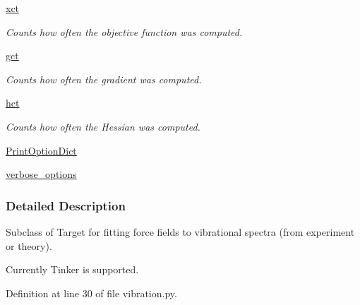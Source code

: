 \begin{DoxyCompactItemize}
\hyperlink{classforcebalance_1_1target_1_1Target_aad2e385cfbf7b4a68f1c2cb41133fe82}{xct}
\begin{DoxyCompactList}\small\item\em Counts how often the objective function was computed. \end{DoxyCompactList}\item 
\hyperlink{classforcebalance_1_1target_1_1Target_aa625ac88c6744eb14ef281d9496d0dbb}{gct}
\begin{DoxyCompactList}\small\item\em Counts how often the gradient was computed. \end{DoxyCompactList}\item 
\hyperlink{classforcebalance_1_1target_1_1Target_a5b5a42f78052b47f29ed4b940c6111a1}{hct}
\begin{DoxyCompactList}\small\item\em Counts how often the Hessian was computed. \end{DoxyCompactList}\item 
\hyperlink{classforcebalance_1_1BaseClass_afc6659278497d7245bc492ecf405ccae}{Print\-Option\-Dict}
\item 
\hyperlink{classforcebalance_1_1BaseClass_afd68efa29ccd2f320f4cf82198214aac}{verbose\-\_\-options}
\end{DoxyCompactItemize}


\subsubsection{Detailed Description}
Subclass of Target for fitting force fields to vibrational spectra (from experiment or theory). 

Currently Tinker is supported. 

Definition at line 30 of file vibration.\-py.



